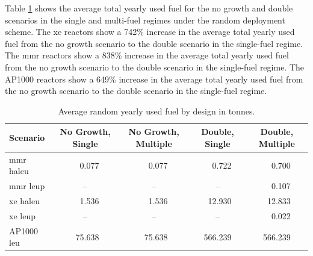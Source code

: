 Table \ref{tab:random_used_avg} shows the average total yearly used fuel for the no growth and double scenarios in the single and multi-fuel regimes under the random deployment scheme. The \gls{xe} reactors show a 742\% increase in the average total yearly used fuel from the no growth scenario to the double scenario in the single-fuel regime. The \gls{mmr} reactors show a 838\% increase in the average total yearly used fuel from the no growth scenario to the double scenario in the single-fuel regime. The AP1000 reactors show a 649\% increase in the average total yearly used fuel from the no growth scenario to the double scenario in the single-fuel regime.

\begin{table}[H]
    \centering
    \caption{Average random yearly used fuel by design in tonnes.}
    \label{tab:random_used_avg}
    \begin{tabular}{l c c c c}
       \hline
       Scenario & No Growth, Single & No Growth, Multiple & Double, Single & Double, Multiple  \\
       \hline
       \gls{mmr} \gls{haleu}   & \textcolor{white}{00}0.077    & \textcolor{white}{00}0.077   & \textcolor{white}{00}0.722    & \textcolor{white}{00}0.700    \\
       \gls{mmr} \gls{leup}    & --       & --      & --       & \textcolor{white}{00}0.107    \\
       \gls{xe} \gls{haleu}    & \textcolor{white}{00}1.536    & \textcolor{white}{00}1.536   & \textcolor{white}{0}12.930   & \textcolor{white}{0}12.833   \\
       \gls{xe} \gls{leup}     & --       & --      & --       & \textcolor{white}{00}0.022    \\
       AP1000 \gls{leu}        & \textcolor{white}{0}75.638   & \textcolor{white}{0}75.638  & 566.239  & 566.239  \\
       \hline
    \end{tabular}
\end{table}

